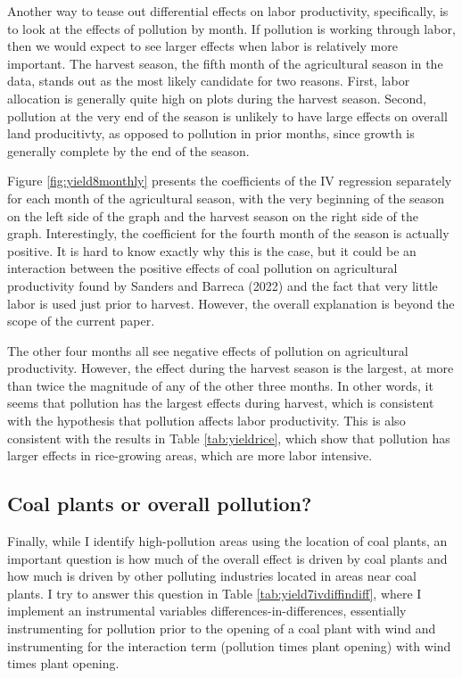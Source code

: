 \documentclass[
]{article}
\begin{document}
Another way to tease out differential effects on labor productivity, specifically, is to look at the effects of pollution by month. If pollution is working through labor, then we would expect to see larger effects when labor is relatively more important. The harvest season, the fifth month of the agricultural season in the data, stands out as the most likely candidate for two reasons. First, labor allocation is generally quite high on plots during the harvest season. Second, pollution at the very end of the season is unlikely to have large effects on overall land producitivty, as opposed to pollution in prior months, since growth is generally complete by the end of the season.

Figure \ref{fig:yield8monthly} presents the coefficients of the IV regression separately for each month of the agricultural season, with the very beginning of the season on the left side of the graph and the harvest season on the right side of the graph. Interestingly, the coefficient for the fourth month of the season is actually positive. It is hard to know exactly why this is the case, but it could be an interaction between the positive effects of coal pollution on agricultural productivity found by Sanders and Barreca (2022) and the fact that very little labor is used just prior to harvest. However, the overall explanation is beyond the scope of the current paper.

The other four months all see negative effects of pollution on agricultural productivity. However, the effect during the harvest season is the largest, at more than twice the magnitude of any of the other three months. In other words, it seems that pollution has the largest effects during harvest, which is consistent with the hypothesis that pollution affects labor productivity. This is also consistent with the results in Table \ref{tab:yieldrice}, which show that pollution has larger effects in rice-growing areas, which are more labor intensive.

\hypertarget{coal-plants-or-overall-pollution}{%
\subsection{Coal plants or overall pollution?}\label{coal-plants-or-overall-pollution}}

Finally, while I identify high-pollution areas using the location of coal plants, an important question is how much of the overall effect is driven by coal plants and how much is driven by other polluting industries located in areas near coal plants. I try to answer this question in Table \ref{tab:yield7ivdiffindiff}, where I implement an instrumental variables differences-in-differences, essentially instrumenting for pollution prior to the opening of a coal plant with wind and instrumenting for the interaction term (pollution times plant opening) with wind times plant opening.
\end{document}
